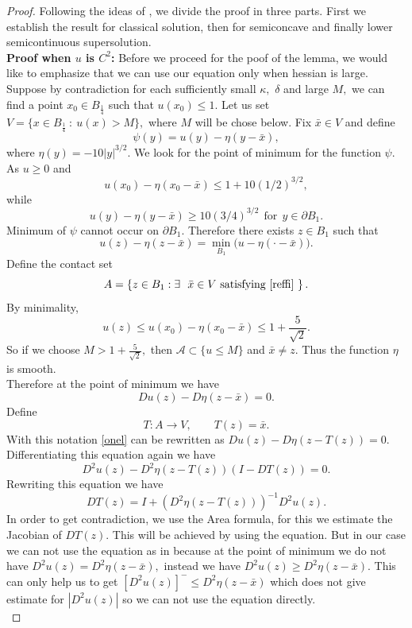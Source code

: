 \documentclass{amsart}
\theoremstyle{plain}
\numberwithin{equation}{section}
\begin{document}
\begin{proof} Following the ideas of \cite{imbert2016estimates}, we divide the proof in three parts. First we establish the result for classical solution, then for semiconcave and finally lower semicontinuous supersolution.\\
\textbf{Proof when $u$ is $C^{2}$:} Before we proceed for the poof of the lemma, we would like to emphasize that we can use our equation only when hessian is large. Suppose by contradiction for each sufficiently small $\kappa,$ $\delta$ and large $M,$ we can find a point $x_{0}\in B_{\frac{1}{4}}$ such that $u(x_{0})\leq 1.$ Let us set $V=\{x\in B_{\frac{1}{4}}~:~u(x)>M\},$ where $M$ will be chose below. Fix $\bar x\in V$ and define
\[\psi(y)=u(y)-\eta(y-\bar x),\]
where $\eta(y)=-10|y|^{3/2}.$ We look for the point of minimum for the function $\psi.$ As $u\ge0$ and
\[u(x_{0})-\eta(x_{0}-\bar x)\leq 1+10(1/2)^{3/2},\]
while
\[u(y)-\eta(y-\bar x)\geq10(3/4)^{3/2}~~\text{for}~~y\in\partial B_{1}.\]
Minimum of $\psi$ cannot occur on $\partial B_{1}.$ Therefore there exists $z\in B_{1}$ such that
\begin{equation}\label{reffi}
u(z)-\eta(z-\bar x)=\min_{B_{1}}\big(u-\eta(\cdot-\bar x)\big).
\end{equation}
Define the contact set
\[A=\left\{z\in B_{1}:\exists~~\bar x\in V~\text{satisfying}~\eqref{reffi}~\right\}.\]
By minimality,
\[u(z)\le u(x_{0})-\eta(x_{0}-\bar x)\leq1+\frac{5}{\sqrt{2}}.\]
 So if we choose $M>1+\frac{5}{\sqrt{2}},$ then $\mathcal A\subset\{u\leq M\}$ and $\bar{x}\not=z.$ Thus the function $\eta$ is smooth.\\
Therefore at the point of minimum we have
\begin{equation}\label{onel}
 Du(z)-D\eta(z-\bar x)=0.
 \end{equation}
Define
\[T:A\to V,\qquad T(z)=\bar x.\]
With this notation \eqref{onel} can be rewritten as $Du(z)-D\eta(z-T(z))=0.$ Differentiating this equation again we have
\[D^{2}u(z)-D^{2}\eta(z-T(z))(I-DT(z))=0.\]
Rewriting this equation we have
\begin{equation}\label{jaco}
DT(z)=I+(D^{2}\eta(z-T(z)))^{-1}D^{2}u(z).
\end{equation}
In order to get contradiction, we use the Area formula, for this we estimate the Jacobian of $DT(z).$ This will be achieved by using the equation. But in our case we can not use the equation as in \cite{imbert2016estimates} because at the point of minimum we do not have $D^{2}u(z)=D^{2}\eta(z-\bar{x}),$ instead we have $D^{2}u(z)\geq D^{2}\eta(z-\bar{x}).$ This can only help us to get $[D^{2}u(z)]^{-}\leq D^{2}\eta(z-\bar{x})$ which does not give estimate for $|D^{2}u(z)|$ so we can not use the equation directly.\\ 

\end{proof}
\end{document}

